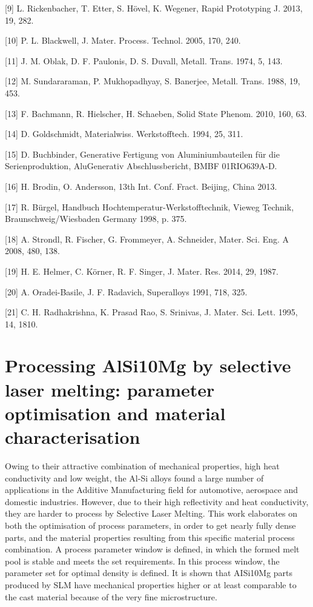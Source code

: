 \documentclass[10pt]{article}
\begin{document}
[9] L. Rickenbacher, T. Etter, S. Hövel, K. Wegener, Rapid Prototyping J. 2013, 19, 282.

[10] P. L. Blackwell, J. Mater. Process. Technol. 2005, 170, 240.

[11] J. M. Oblak, D. F. Paulonis, D. S. Duvall, Metall. Trans. 1974, 5, 143.

[12] M. Sundararaman, P. Mukhopadhyay, S. Banerjee, Metall. Trans. 1988, 19, 453.

[13] F. Bachmann, R. Hielscher, H. Schaeben, Solid State Phenom. 2010, 160, 63.

[14] D. Goldschmidt, Materialwiss. Werkstofftech. 1994, 25, 311.

[15] D. Buchbinder, Generative Fertigung von Aluminiumbauteilen für die Serienproduktion, AluGenerativ Abschlussbericht, BMBF 01RIO639A-D.

[16] H. Brodin, O. Andersson, 13th Int. Conf. Fract. Beijing, China 2013.

[17] R. Bürgel, Handbuch Hochtemperatur-Werkstofftechnik, Vieweg Technik, Braunschweig/Wiesbaden Germany 1998, p. 375.

[18] A. Strondl, R. Fischer, G. Frommeyer, A. Schneider, Mater. Sci. Eng. A 2008, 480, 138.

[19] H. E. Helmer, C. Körner, R. F. Singer, J. Mater. Res. 2014, 29, 1987.

[20] A. Oradei-Basile, J. F. Radavich, Superalloys 1991, 718, 325.

[21] C. H. Radhakrishna, K. Prasad Rao, S. Srinivas, J. Mater. Sci. Lett. 1995, 14, 1810.

\section*{Processing AlSi10Mg by selective laser melting: parameter optimisation and material characterisation }
Owing to their attractive combination of mechanical properties, high heat conductivity and low weight, the Al-Si alloys found a large number of applications in the Additive Manufacturing field for automotive, aerospace and domestic industries. However, due to their high reflectivity and heat conductivity, they are harder to process by Selective Laser Melting. This work elaborates on both the optimisation of process parameters, in order to get nearly fully dense parts, and the material properties resulting from this specific material process combination. A process parameter window is defined, in which the formed melt pool is stable and meets the set requirements. In this process window, the parameter set for optimal density is defined. It is shown that AISi10Mg parts produced by SLM have mechanical properties higher or at least comparable to the cast material because of the very fine microstructure.
\end{document}
